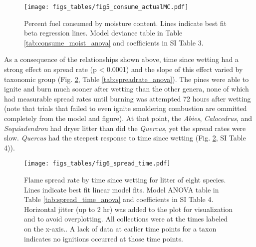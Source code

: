 \documentclass[fire,article,submit,moreauthors,pdftex]{Definitions/mdpi}
\begin{document}
\begin{figure}[H]
  \centering
\texttt{[image: figs\_tables/fig5\_consume\_actualMC.pdf]}
\caption{Percent fuel consumed by moisture content. Lines indicate best fit beta regression lines. Model deviance table in Table \ref{tab:consume_moist_anova} and coefficients in SI Table 3.}
  \label{fig:consume_moist}
\end{figure}


\begin{table}[H]
  \caption{Generalized linear mixed model results for fuel consumption as a function of fuel moisture with taxonomic group as a fixed effect and species as a nested random effect.  The analysis of deviance table below shows deviance comparisons for the simplest null model with only intercept and random effect (model 1), for a taxon effect only (model 2), for a taxon and mosture content effect (model 3) and for the full model including the taxon by moisture interaction (model 4). Coefficient estimates are in SI Table 3.}
  \label{tab:consume_moist_anova}
\centering

\end{table}

As a consequence of the relationships shown above, time since wetting had a strong effect on spread rate (p < 0.0001) and the slope of this effect varied by taxonomic group (Fig. \ref{fig:spread_time}, Table \ref{tab:spreadrate_anova}). The pines were able to ignite and burn much sooner after wetting than the other genera, none of which had measurable spread rates until burning was attempted 72 hours after wetting (note that trials that failed to even ignite smoldering combustion are ommitted completely from the model and figure). At that point, the \emph{Abies}, \emph{Calocedrus}, and \emph{Sequiadendron} had dryer litter than did the \emph{Quercus}, yet the spread rates were slow. \emph{Quercus} had the steepest response to time since wetting (Fig. \ref{fig:spread_time}, SI Table 4)).


\begin{figure}[H]
  \centering
\texttt{[image: figs\_tables/fig6\_spread\_time.pdf]}
\caption{Flame spread rate by time since wetting for litter of eight species.
  Lines indicate best fit linear model fits. Model ANOVA table in Table
  \ref{tab:spread_time_anova} and coefficients in SI Table 4. Horizontal
  jitter (up to 2 hr) was added to the plot for visualization and to avoid
  overplotting. All collections were at the times labeled on the x-axis.. A
  lack of data at earlier time points for a taxon indicates no ignitions
  occurred at those time points.}
  \label{fig:spread_time}
\end{figure}
\end{document}

